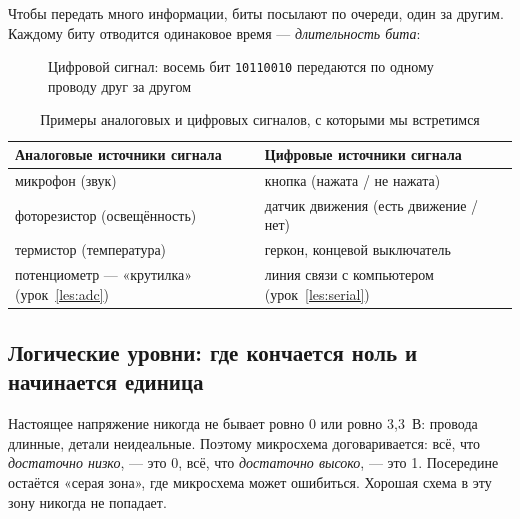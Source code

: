 Чтобы передать много информации, биты посылают по очереди, один за другим. Каждому биту отводится
одинаковое время --- \emph{длительность бита}:

\begin{figure}[H]
\centering
{}
\caption{Цифровой сигнал: восемь бит \texttt{10110010} передаются по одному проводу друг за другом}
\end{figure}

\begin{table}[H]
\centering\small
\begin{tabularx}{\textwidth}{@{}X X@{}}
\toprule
\textbf{Аналоговые источники сигнала} & \textbf{Цифровые источники сигнала}\\
\midrule
микрофон (звук) & кнопка (нажата / не нажата)\\
фоторезистор (освещённость) & датчик движения (есть движение / нет)\\
термистор (температура) & геркон, концевой выключатель\\
потенциометр --- «крутилка» (урок~\ref{les:adc}) & линия связи с компьютером (урок~\ref{les:serial})\\
\bottomrule
\end{tabularx}
\caption{Примеры аналоговых и цифровых сигналов, с которыми мы встретимся}
\end{table}

\subsection*{Логические уровни: где кончается ноль и начинается единица}

Настоящее напряжение никогда не бывает ровно 0 или ровно 3,3~В: провода длинные, детали неидеальные.
Поэтому микросхема договаривается: всё, что \emph{достаточно низко}, --- это 0, всё, что
\emph{достаточно высоко}, --- это 1. Посередине остаётся «серая зона», где микросхема может
ошибиться. Хорошая схема в эту зону никогда не попадает.

